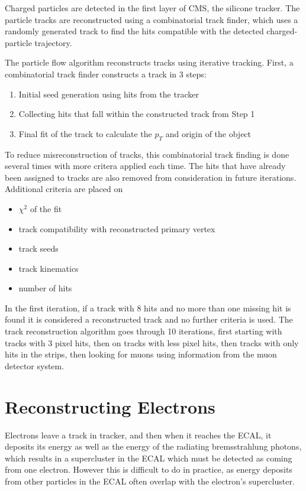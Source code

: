 Charged particles are detected in the first layer of CMS, the silicone tracker. The particle tracks are reconstructed using a combinatorial track finder, which uses a randomly generated track to find the hits compatible with the detected charged-particle trajectory. 


The particle flow algorithm reconstructs tracks using iterative tracking. First, a combinatorial track finder constructs a track in 3 steps:

\begin{enumerate}
	\item Initial seed generation using hits from the tracker
	\item Collecting hits that fall within the constructed track from Step 1
	\item Final fit of the track to calculate the $p_T$ and origin of the object
\end{enumerate}


To reduce misreconstruction of tracks, this combinatorial track finding is done several times with more critera applied each time. The hits that have already been assigned to tracks are also removed from consideration in future iterations. Additional criteria are placed on 

\begin{itemize}
	\item $\chi^2$ of the fit
	\item track compatibility with reconstructed primary vertex
	\item track seeds
	\item track kinematics
	\item number of hits
\end{itemize}

In the first iteration, if a track with 8 hits and no more than one missing hit is found it is considered a reconstructed track and no further criteria is used. The track reconstruction algorithm goes through 10 iterations, first starting with tracks with 3 pixel hits, then on tracks with less pixel hits, then tracks with only hits in the strips, then looking for muons using information from the muon detector system.

\section{Reconstructing Electrons}

Electrons leave a track in tracker, and then when it reaches the ECAL, it deposits its energy as well as the energy of the radiating bremsstrahlung photons, which results in a supercluster in the ECAL which must be detected as coming from one electron. However this is difficult to do in practice, as energy deposits from other particles in the ECAL often overlap with the electron’s supercluster.


